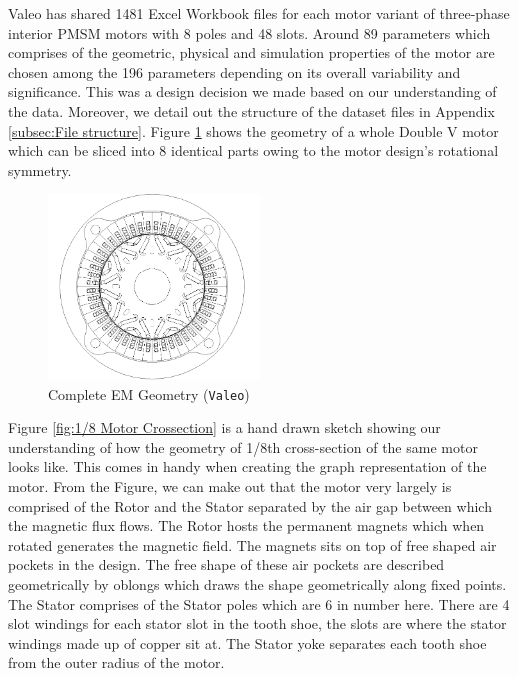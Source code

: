 \documentclass{report} %
\begin{document}
Valeo has shared 1481 Excel Workbook files for each motor variant of three-phase interior \ac{PMSM} motors with 8 poles and 48 slots. 
Around 89 parameters which comprises of the geometric, physical and simulation properties of the motor are chosen among the 196 parameters depending on its overall variability and significance.
This was a design decision we made based on our understanding of the data.
Moreover, we detail out the structure of the dataset files in Appendix \ref{subsec:File structure}.
Figure \ref{fig:Full Motor} shows the geometry of a whole Double V motor which can be sliced into 8 identical parts owing to the motor design's rotational symmetry.
\begin{figure}[H]
    \centering
    \includegraphics[width=0.5\textwidth]{./ReportImages/FullMotorv2.png} 
    \caption{Complete \ac{EM} Geometry (\texttt{Valeo})}
    \label{fig:Full Motor}
\end{figure}
Figure \ref{fig:1/8 Motor Crossection} is a hand drawn sketch showing our understanding of how the geometry of 1/8th cross-section of the same motor looks like.
This comes in handy when creating the graph representation of the motor.
From the Figure, we can make out that the motor very largely is comprised of the Rotor and the Stator separated by the air gap between which the magnetic flux flows.
The Rotor hosts the permanent magnets which when rotated generates the magnetic field. The magnets sits on top of free shaped air pockets in the design. 
The free shape of these air pockets are described geometrically by oblongs which draws the shape geometrically along fixed points.
The Stator comprises of the Stator poles which are 6 in number here. There are 4 slot windings for each stator slot in the tooth shoe, the slots are where the stator windings made 
up of copper sit at. The Stator yoke separates each tooth shoe from the outer radius of the motor.
\end{document}
